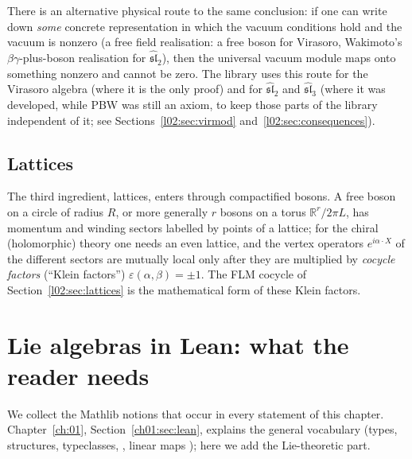 There is an alternative physical route to the same conclusion: if one can write down \emph{some}
concrete representation in which the vacuum conditions hold and the vacuum is nonzero (a free
field realisation: a free boson for Virasoro, Wakimoto's $\beta\gamma$-plus-boson realisation for
$\widehat{\mathfrak{sl}}_2$), then the universal vacuum module maps onto something nonzero and
cannot be zero. The library uses this route for the Virasoro algebra (where it is the only proof)
and for $\widehat{\mathfrak{sl}}_2$ and $\widehat{\mathfrak{sl}}_3$ (where it was developed, while PBW
was still an axiom, to keep those parts of the library independent of it; see
Sections~\ref{l02:sec:virmod} and~\ref{l02:sec:consequences}).

\subsection{Lattices}

The third ingredient, lattices, enters through compactified bosons. A free boson on a circle of
radius $R$, or more generally $r$ bosons on a torus $\mathbb{R}^r/2\pi L$, has momentum and winding
sectors labelled by points of a lattice; for the chiral (holomorphic) theory one needs an even
lattice, and the vertex operators $e^{i\alpha\cdot X}$ of the different sectors are mutually local
only after they are multiplied by \emph{cocycle factors} (``Klein factors'') $\varepsilon(\alpha,\beta) =
\pm1$. The FLM cocycle of Section~\ref{l02:sec:lattices} is the mathematical form of these Klein
factors.

\section{Lie algebras in Lean: what the reader needs}\label{l02:sec:lean}

We collect the Mathlib notions that occur in every statement of this chapter. Chapter~\ref{ch:01},
Section~\ref{ch01:sec:lean}, explains the general vocabulary (types, structures, typeclasses,
, linear maps ); here we add the Lie-theoretic part.

